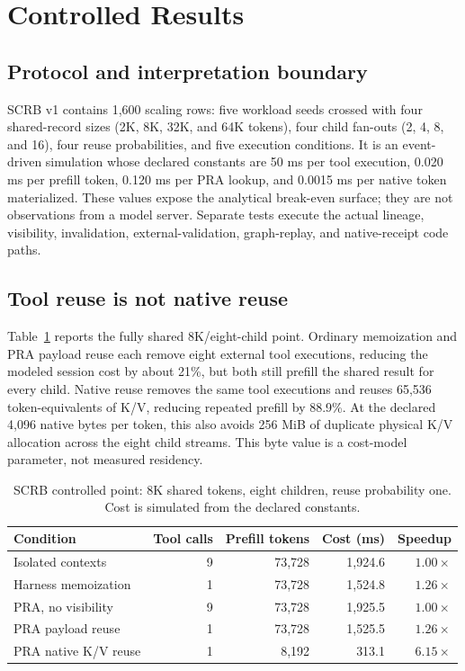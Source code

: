 \documentclass[11pt]{article}
\begin{document}
\section{Controlled Results}

\subsection{Protocol and interpretation boundary}

SCRB v1 contains 1,600 scaling rows: five workload seeds crossed with four
shared-record sizes (2K, 8K, 32K, and 64K tokens), four child fan-outs (2, 4,
8, and 16), four reuse probabilities, and five execution conditions. It is an
event-driven simulation whose declared constants are 50 ms per tool execution,
0.020 ms per prefill token, 0.120 ms per PRA lookup, and 0.0015 ms per native
token materialized. These values expose the analytical break-even surface; they
are not observations from a model server. Separate tests execute the actual
lineage, visibility, invalidation, external-validation, graph-replay, and
native-receipt code paths.

\subsection{Tool reuse is not native reuse}

Table~\ref{tab:scrb-target} reports the fully shared 8K/eight-child point.
Ordinary memoization and PRA payload reuse each remove eight external tool
executions, reducing the modeled session cost by about 21\%, but both still
prefill the shared result for every child. Native reuse removes the same tool
executions and reuses 65,536 token-equivalents of K/V, reducing repeated
prefill by 88.9\%. At the declared 4,096 native bytes per token, this also
avoids 256 MiB of duplicate physical K/V allocation across the eight child
streams. This byte value is a cost-model parameter, not measured residency.

\begin{table}[H]
\centering
\small
\caption{SCRB controlled point: 8K shared tokens, eight children, reuse
probability one. Cost is simulated from the declared constants.}
\label{tab:scrb-target}
\begin{tabular}{lrrrr}
\toprule
Condition & Tool calls & Prefill tokens & Cost (ms) & Speedup \\
\midrule
Isolated contexts & 9 & 73,728 & 1,924.6 & $1.00\times$ \\
Harness memoization & 1 & 73,728 & 1,524.8 & $1.26\times$ \\
PRA, no visibility & 9 & 73,728 & 1,925.5 & $1.00\times$ \\
PRA payload reuse & 1 & 73,728 & 1,525.5 & $1.26\times$ \\
PRA native K/V reuse & 1 & 8,192 & 313.1 & $6.15\times$ \\
\bottomrule
\end{tabular}
\end{table}
\end{document}

